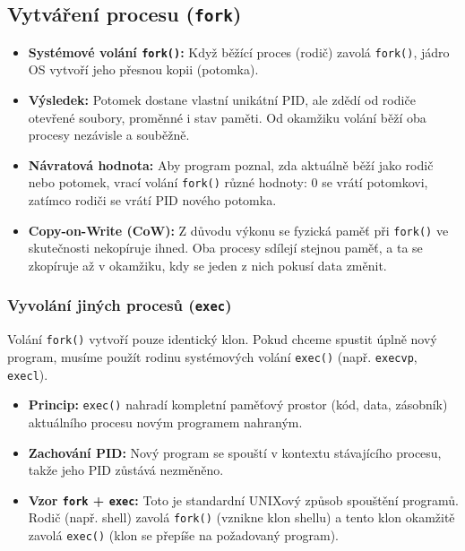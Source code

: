 \subsection{Vytváření procesu (\texttt{fork})}
\begin{itemize}
    \item \textbf{Systémové volání \texttt{fork()}:} Když běžící proces (rodič) zavolá \texttt{fork()}, jádro OS vytvoří jeho přesnou kopii (potomka).
    \item \textbf{Výsledek:} Potomek dostane vlastní unikátní PID, ale zdědí od rodiče otevřené soubory, proměnné i stav paměti. Od okamžiku volání běží oba procesy nezávisle a souběžně.
    \item \textbf{Návratová hodnota:} Aby program poznal, zda aktuálně běží jako rodič nebo potomek, vrací volání \texttt{fork()} různé hodnoty: 0 se vrátí potomkovi, zatímco rodiči se vrátí PID nového potomka.
    \item \textbf{Copy-on-Write (CoW):} Z důvodu výkonu se fyzická paměť při \texttt{fork()} ve skutečnosti nekopíruje ihned. Oba procesy sdílejí stejnou paměť, a ta se zkopíruje až v okamžiku, kdy se jeden z nich pokusí data změnit.
\end{itemize}

\subsubsection*{Vyvolání jiných procesů (\texttt{exec})}
Volání \texttt{fork()} vytvoří pouze identický klon. Pokud chceme spustit úplně nový program, musíme použít rodinu systémových volání \texttt{exec()} (např. \texttt{execvp}, \texttt{execl}).
\begin{itemize}
    \item \textbf{Princip:} \texttt{exec()} nahradí kompletní paměťový prostor (kód, data, zásobník) aktuálního procesu novým programem nahraným.
    \item \textbf{Zachování PID:} Nový program se spouští v kontextu stávajícího procesu, takže jeho PID zůstává nezměněno.
    \item \textbf{Vzor \texttt{fork} + \texttt{exec}:} Toto je standardní UNIXový způsob spouštění programů. Rodič (např. shell) zavolá \texttt{fork()} (vznikne klon shellu) a tento klon okamžitě zavolá \texttt{exec()} (klon se přepíše na požadovaný program).
\end{itemize}

